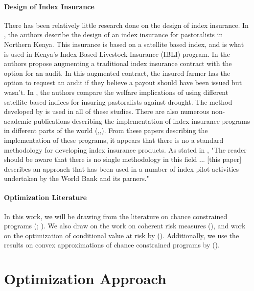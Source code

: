 \documentclass[11pt]{article}
\begin{document}
\paragraph{Design of Index Insurance} There has been relatively little research done on the design of index insurance. In \cite{chantarat2013designing}, the authors describe the design of an index insurance for pastoralists in Northern Kenya. This insurance is based on a satellite based index, and is what is used in Kenya's Index Based Livestock Insurance (IBLI) program. In \cite{flatnes2018improving} the authors propose augmenting a traditional index insurance contract with the option for an audit. In this augmented contract, the insured farmer has the option to request an audit if they believe a payout should have been issued but wasn't. In \cite{jensen2019does}, the authors compare the welfare implications of using different satellite based indices for insuring pastoralists against drought. The method developed by \cite{chantarat2013designing} is used in all of these studies. There are also numerous non-academic publications describing the implementation of index insurance programs in different parts of the world (\cite{osgood2007designing},\cite{world2011weather},\cite{greatrex2015scaling}). From these papers describing the implementation of these programs, it appears that there is no a standard methodology for developing index insurance products. As stated in \cite{world2011weather}, "The reader should be aware that there is no single methodology in this field ... [this paper] describes an approach that has been used in a number of index pilot activities undertaken by the World Bank and its parners." 

\paragraph{Optimization Literature} In this work, we will be drawing from the literature on chance constrained programs (\cite{lagoa2005probabilistically}; \cite{charnes1958cost}). We also draw on the work on coherent risk measures (\cite{artzner1999coherent}), and work on the optimization of conditional value at risk by (\cite{rockafellar2000optimization}). Additionally, we use the results on convex approximations of chance constrained programs by (\cite{nemirovski2007convex}).

\section{Optimization Approach}
\end{document}

